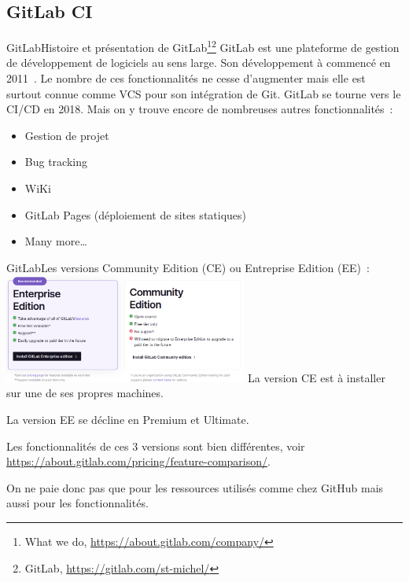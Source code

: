 \documentclass{beamer}
\begin{document}
    \subsection{GitLab CI}\label{subsec:gitlab-ci}

    \begin{frame}{GitLab}{Histoire et présentation de GitLab\footnote{What we do, \url{https://about.gitlab.com/company/}}\footnotestep\footnote{GitLab, \url{https://gitlab.com/st-michel/}}}
        \transdissolve
        GitLab est une plateforme de gestion de développement de logiciels au sens large.
        Son développement à commencé en 2011~.
        \bigbreak
        Le nombre de ces fonctionnalités ne cesse d'augmenter mais elle est surtout connue comme VCS pour son intégration de Git.
        \bigbreak
        GitLab se tourne vers le CI/CD en 2018.
        \bigbreak
        Mais on y trouve encore de nombreuses autres fonctionnalités~:
        \begin{itemize}
            \item Gestion de projet
            \item Bug tracking
            \item WiKi
            \item GitLab Pages (déploiement de sites statiques)
            \item Many more\ldots
        \end{itemize}
    \end{frame}

    \begin{frame}{GitLab}{Les versions}
        \transdissolve
        Community Edition (CE) ou Entreprise Edition (EE)~:
        \bigbreak
        \centering
        \includegraphics[width=8cm]{image/gitlab-versions}
        \flushleft
        La version CE est à installer sur une de ses propres machines.

        La version EE se décline en Premium et Ultimate.

        Les fonctionnalités de ces 3 versions sont bien différentes, voir \url{https://about.gitlab.com/pricing/feature-comparison/}.

        On ne paie donc pas que pour les ressources utilisés comme chez GitHub mais aussi pour les fonctionnalités.
    \end{frame}
\end{document}
